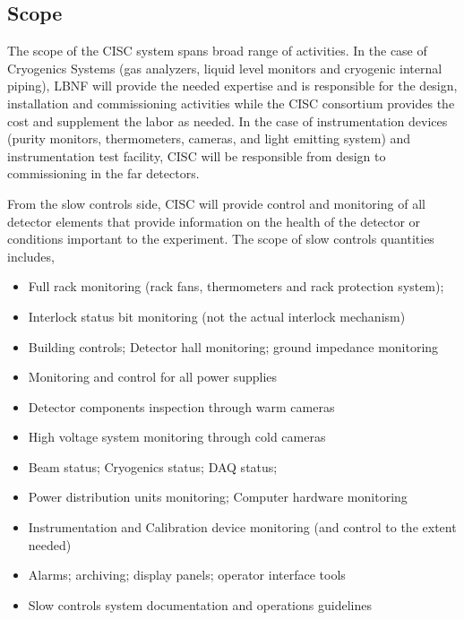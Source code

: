 

\subsection{Scope}
\label{sec:fddp-slow-cryo-scope}


The scope of the CISC system spans broad range of activities. In the
case of Cryogenics Systems (gas analyzers, liquid level monitors and
cryogenic internal piping), LBNF will provide the needed expertise and
is responsible for the design, installation and commissioning activities
while the CISC consortium provides the cost and supplement the labor as
needed. In the case of instrumentation devices (purity monitors,
thermometers, cameras, and light emitting system) and instrumentation
test facility, CISC will be responsible from design to commissioning in
the far detectors.

From the slow controls side, CISC will provide control and monitoring of
all detector elements that provide information on the health of the
detector or conditions important to the experiment. The scope of slow
controls quantities includes,

\begin{itemize}
\item
  Full rack monitoring (rack fans, thermometers and rack protection
  system); 
\item
  Interlock status bit monitoring (not the actual interlock mechanism)
\item
  Building controls; Detector hall monitoring; ground impedance
  monitoring
\item
  Monitoring and control for all power supplies
\item
  Detector components inspection through warm cameras
\item
  High voltage system monitoring through cold cameras
\item
  Beam status; Cryogenics status; DAQ status; 
\item
  Power distribution units monitoring; Computer hardware monitoring
\item
  Instrumentation and Calibration device monitoring (and control to the
  extent needed)
\item
  Alarms; archiving; display panels; operator interface tools 
\item
  Slow controls system documentation and operations guidelines
\end{itemize}

